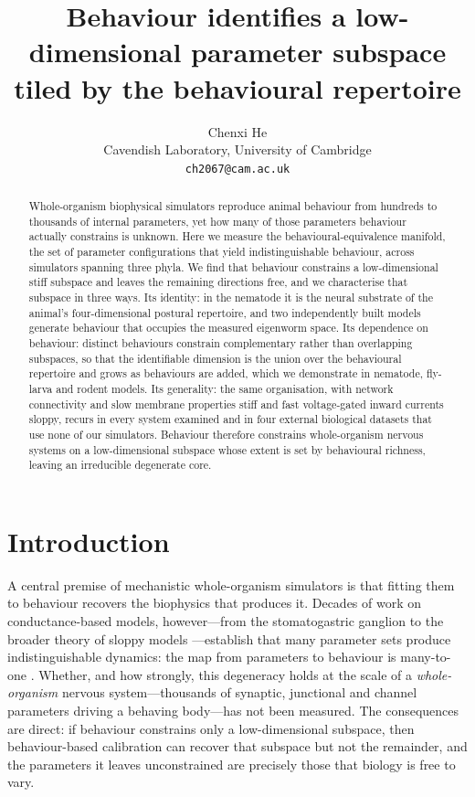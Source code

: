 \documentclass[11pt]{article}
\title{\textbf{Behaviour identifies a low-dimensional parameter subspace tiled by the behavioural repertoire}}
\author{Chenxi He \\ Cavendish Laboratory, University of Cambridge \\ \texttt{ch2067@cam.ac.uk}}
\date{}
\begin{document}
\maketitle

\begin{abstract}
\noindent
Whole-organism biophysical simulators reproduce animal behaviour from hundreds to thousands of internal parameters, yet how many of those parameters behaviour actually constrains is unknown. Here we measure the behavioural-equivalence manifold, the set of parameter configurations that yield indistinguishable behaviour, across simulators spanning three phyla. We find that behaviour constrains a low-dimensional stiff subspace and leaves the remaining directions free, and we characterise that subspace in three ways. Its identity: in the nematode it is the neural substrate of the animal's four-dimensional postural repertoire, and two independently built models generate behaviour that occupies the measured eigenworm space. Its dependence on behaviour: distinct behaviours constrain complementary rather than overlapping subspaces, so that the identifiable dimension is the union over the behavioural repertoire and grows as behaviours are added, which we demonstrate in nematode, fly-larva and rodent models. Its generality: the same organisation, with network connectivity and slow membrane properties stiff and fast voltage-gated inward currents sloppy, recurs in every system examined and in four external biological datasets that use none of our simulators. Behaviour therefore constrains whole-organism nervous systems on a low-dimensional subspace whose extent is set by behavioural richness, leaving an irreducible degenerate core.
\end{abstract}

\section*{Introduction}
A central premise of mechanistic whole-organism simulators is that fitting them to behaviour recovers the biophysics that produces it. Decades of work on conductance-based models, however---from the stomatogastric ganglion \citep{prinz2004similar,marder2006variability} to the broader theory of sloppy models \citep{gutenkunst2007universally,transtrum2015perspective}---establish that many parameter sets produce indistinguishable dynamics: the map from parameters to behaviour is many-to-one \citep{goldman2001global,taylor2009how,marder2011variability,edelman2001degeneracy,alonso2019visualization}. Whether, and how strongly, this degeneracy holds at the scale of a \emph{whole-organism} nervous system---thousands of synaptic, junctional and channel parameters driving a behaving body---has not been measured. The consequences are direct: if behaviour constrains only a low-dimensional subspace, then behaviour-based calibration can recover that subspace but not the remainder, and the parameters it leaves unconstrained are precisely those that biology is free to vary.
\end{document}
